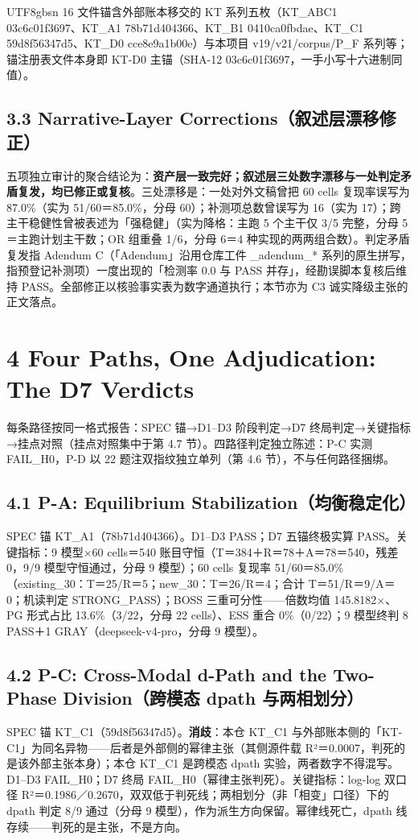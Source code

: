 \documentclass[10pt,a4paper]{article}
\begin{document}
\begin{CJK}{UTF8}{gbsn}
16 文件锚含外部账本移交的 KT 系列五枚（KT\_ABC1 03c6c01f3697、KT\_A1 78b71d404366、KT\_B1 0410ca0fbdae、KT\_C1 59d8f56347d5、KT\_D0 cce8e9a1b00e）与本项目 v19/v21/corpus/P\_F 系列等；锚注册表文件本身即 KT-D0 主锚（SHA-12 03c6c01f3697，一手小写十六进制同值）。

\subsection*{3.3 Narrative-Layer Corrections（叙述层漂移修正）}五项独立审计的聚合结论为：\textbf{资产层一致完好；叙述层三处数字漂移与一处判定矛盾复发，均已修正或复核}。三处漂移是：一处对外文稿曾把 60 cells 复现率误写为 87.0\%（实为 51/60＝85.0\%，分母 60）；补测项总数曾误写为 16（实为 17）；跨主干稳健性曾被表述为「强稳健」（实为降格：主跑 5 个主干仅 3/5 完整，分母 5＝主跑计划主干数；OR 组重叠 1/6，分母 6＝4 种实现的两两组合数）。判定矛盾复发指 Adendum C（「Adendum」沿用仓库工件 \_adendum\_* 系列的原生拼写，指预登记补测项）一度出现的「检测率 0.0 与 PASS 并存」，经勘误脚本复核后维持 PASS。全部修正以核验事实表为数字通道执行；本节亦为 C3 诚实降级主张的正文落点。


\section*{4 Four Paths, One Adjudication: The D7 Verdicts}每条路径按同一格式报告：SPEC 锚→D1–D3 阶段判定→D7 终局判定→关键指标→挂点对照（挂点对照集中于第 4.7 节）。四路径判定独立陈述：P-C 实测 FAIL\_H0，P-D 以 22 题注双指纹独立单列（第 4.6 节），不与任何路径捆绑。

\subsection*{4.1 P-A: Equilibrium Stabilization（均衡稳定化）}SPEC 锚 KT\_A1（78b71d404366）。D1–D3 PASS；D7 五锚终极实算 PASS。关键指标：9 模型×60 cells＝540 账目守恒（T＝384＋R＝78＋A＝78＝540，残差 0，9/9 模型守恒通过，分母 9 模型）；60 cells 复现率 51/60＝85.0\%（existing\_30：T＝25/R＝5；new\_30：T＝26/R＝4；合计 T＝51/R＝9/A＝0；机读判定 STRONG\_PASS）；BOSS 三重可分性——倍数均值 145.8182×、PG 形式占比 13.6\%（3/22，分母 22 cells）、ESS 重合 0\%（0/22）；9 模型终判 8 PASS＋1 GRAY（deepseek-v4-pro，分母 9 模型）。

\subsection*{4.2 P-C: Cross-Modal d-Path and the Two-Phase Division（跨模态 dpath 与两相划分）}SPEC 锚 KT\_C1（59d8f56347d5）。\textbf{消歧}：本仓 KT\_C1 与外部账本侧的「KT-C1」为同名异物——后者是外部侧的幂律主张（其侧源件载 R²＝0.0007，判死的是该外部主张本身）；本仓 KT\_C1 是跨模态 dpath 实验，两者数字不得混写。D1–D3 FAIL\_H0；D7 终局 FAIL\_H0（幂律主张判死）。关键指标：log-log 双口径 R²＝0.1986／0.2670，双双低于判死线；两相划分（非「相变」口径）下的 dpath 判定 8/9 通过（分母 9 模型），作为派生方向保留。幂律线死亡，dpath 线存续——判死的是主张，不是方向。


\end{CJK}
\end{document}
